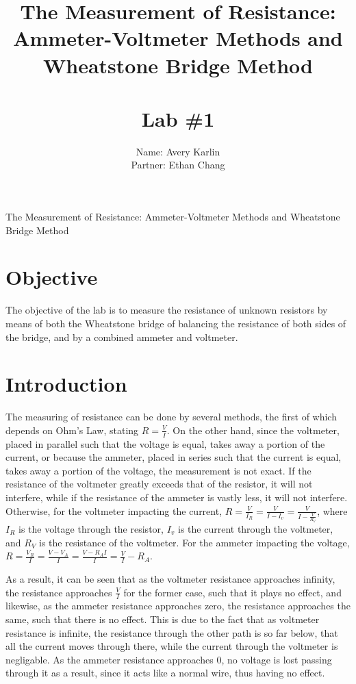 \documentclass[11pt, titlepage]{article}
\title{The Measurement of Resistance: Ammeter-Voltmeter Methods and Wheatstone Bridge Method \\ \ \\ \large Lab \#1}
\author{Name: Avery Karlin \\ Partner: Ethan Chang}
\date{}
\begin{document}
\maketitle

\begin{center}
\LARGE The Measurement of Resistance: Ammeter-Voltmeter Methods and Wheatstone Bridge Method
\end{center}

\section*{Objective}
The objective of the lab is to measure the resistance of unknown resistors by means of both the Wheatstone bridge of balancing the resistance of both sides of the bridge, and by a combined ammeter and voltmeter.

\section*{Introduction}
The measuring of resistance can be done by several methods, the first of which depends on Ohm's Law, stating $R = \frac{V}{I}$. On the other hand, since the voltmeter, placed in parallel such that the voltage is equal, takes away a portion of the current, or because the ammeter, placed in series such that the current is equal, takes away a portion of the voltage, the measurement is not exact. If the resistance of the voltmeter greatly exceeds that of the resistor, it will not interfere, while if the resistance of the ammeter is vastly less, it will not interfere. Otherwise, for the voltmeter impacting the current, $R = \frac{V}{I_R} = \frac{V}{I - I_v} = \frac{V}{I - \frac{V}{R_V}}$, where $I_R$ is the voltage through the resistor, $I_v$ is the current through the voltmeter, and $R_V$ is the resistance of the voltmeter. For the ammeter impacting the voltage, $R = \frac{V_R}{I} = \frac{V - V_A}{I} = \frac{V - R_AI}{I} = \frac{V}{I} - R_A$.

As a result, it can be seen that as the voltmeter resistance approaches infinity, the resistance approaches $\frac{V}{I}$ for the former case, such that it plays no effect, and likewise, as the ammeter resistance approaches zero, the resistance approaches the same, such that there is no effect. This is due to the fact that as voltmeter resistance is infinite, the resistance through the other path is so far below, that all the current moves through there, while the current through the voltmeter is negligable. As the ammeter resistance approaches 0, no voltage is lost passing through it as a result, since it acts like a normal wire, thus having no effect.
\end{document}
